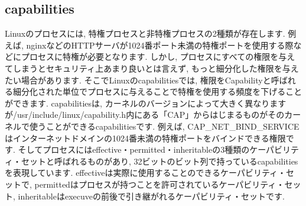 \subsection{capabilities}
Linuxのプロセスには, 特権プロセスと非特権プロセスの2種類が存在します. 例えば, nginxなどのHTTPサーバが1024番ポート未満の特権ポートを使用する際などにプロセスに特権が必要となります. しかし, プロセスにすべての権限を与えてしまうとセキュリティ上あまり良いとは言えず, もっと細分化した権限を与えたい場合があります. そこでLinuxのcapabilitiesでは, 権限をCapabilityと呼ばれる細分化された単位でプロセスに与えることで特権を使用する頻度を下げることができます. capabilitiesは, カーネルのバージョンによって大きく異なりますが/usr/include/linux/capability.h内にある「CAP」からはじまるものがそのカーネルで使うことができるcapabilitiesです. 例えば, CAP\_NET\_BIND\_SERVICEはインターネットドメインの1024番未満の特権ポートをバインドできる権限です. そしてプロセスにはeffective・permitted・inheritableの3種類のケーパビリティ・セットと呼ばれるものがあり, 32ビットのビット列で持っているcapabilitiesを表現しています. effectiveは実際に使用することのできるケーパビリティ・セットで, permittedはプロセスが持つことを許可されているケーパビリティ・セット, inheritableはexecuveの前後で引き継がれるケーパビリティ・セットです.
